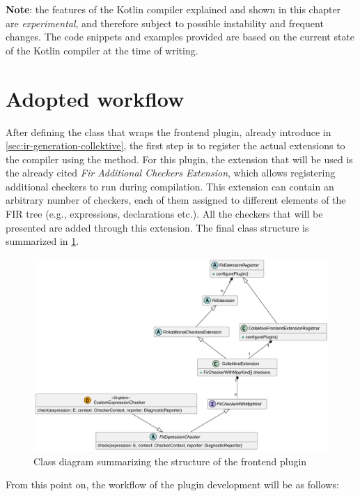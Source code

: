 \documentclass[12pt,a4paper,openright,twoside]{book}
\begin{document}
\textbf{Note}: the features of the Kotlin compiler explained and shown in
this chapter are \emph{experimental}, and therefore subject to possible instability
and frequent changes. The code snippets and examples provided are based on the
current state of the Kotlin compiler at the time of writing. 

\section{Adopted workflow} \label{sec:workflow}

After defining the  class that
wraps the frontend plugin, already introduce in \cref{sec:ir-generation-collektive}, the
first step is to register the actual extensions to the compiler using the
 method. For this plugin, the extension that will
be used is the already cited \emph{Fir Additional Checkers Extension}, which
allows registering additional checkers to run during compilation.
%
This extension can contain an arbitrary number of checkers, each of them
assigned to different elements of the \ac{FIR} tree (e.g., expressions,
declarations etc.). All the checkers that will be presented are added 
through this extension. The final class structure is summarized in
\cref{fig:frontend-class-diagram}.

\begin{figure}
  \centering
  \includegraphics[width=.8\linewidth]{figures/frontend-class-diagram.pdf}
  \caption{Class diagram summarizing the structure of the frontend plugin}
  \label{fig:frontend-class-diagram}
\end{figure}

From this point on, the workflow of the plugin development will be as follows:
\end{document}
